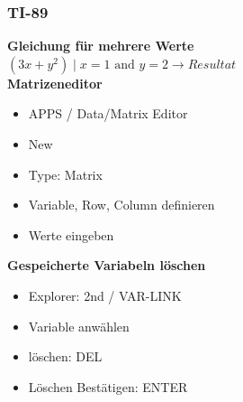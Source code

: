 	
	\begin{minipage}[t]{9.5cm}
		\subsubsection{TI-89}
			\textbf{Gleichung für mehrere Werte}\\
			$(3x+y^2) \mid x=1 \text{ and } y=2 \to Resultat$\\
			\textbf{Matrizeneditor}
			\begin{itemize}
			  \item APPS / Data/Matrix Editor
			  \item New
			  \item Type: Matrix
			  \item Variable, Row, Column definieren
			  \item Werte eingeben
			\end{itemize}
			
			\textbf{Gespeicherte Variabeln löschen}
			\begin{itemize}
			\item Explorer: 2nd / VAR-LINK
			\item Variable anwählen
			\item löschen: DEL
			\item Löschen Bestätigen: ENTER
			\end{itemize}
			
	\end{minipage}
	
